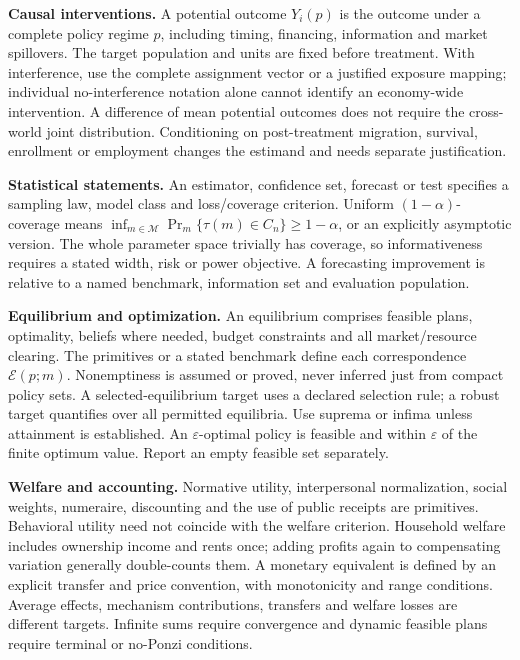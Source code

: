\documentclass[11pt,a4paper]{article}
\begin{document}
\textbf{Causal interventions.} A potential outcome \(Y_i(p)\) is the outcome under a complete policy regime \(p\), including timing, financing, information and market spillovers. The target population and units are fixed before treatment. With interference, use the complete assignment vector or a justified exposure mapping; individual no-interference notation alone cannot identify an economy-wide intervention. A difference of mean potential outcomes does not require the cross-world joint distribution. Conditioning on post-treatment migration, survival, enrollment or employment changes the estimand and needs separate justification.

\textbf{Statistical statements.} An estimator, confidence set, forecast or test specifies a sampling law, model class and loss/coverage criterion. Uniform \((1-\alpha)\)-coverage means \(\inf_{m\in\mathcal M}\Pr_m\{\tau(m)\in C_n\}\geq1-\alpha\), or an explicitly asymptotic version. The whole parameter space trivially has coverage, so informativeness requires a stated width, risk or power objective. A forecasting improvement is relative to a named benchmark, information set and evaluation population.

\textbf{Equilibrium and optimization.} An equilibrium comprises feasible plans, optimality, beliefs where needed, budget constraints and all market/resource clearing. The primitives or a stated benchmark define each correspondence \(\mathcal E(p;m)\). Nonemptiness is assumed or proved, never inferred just from compact policy sets. A selected-equilibrium target uses a declared selection rule; a robust target quantifies over all permitted equilibria. Use suprema or infima unless attainment is established. An \(\varepsilon\)-optimal policy is feasible and within \(\varepsilon\) of the finite optimum value. Report an empty feasible set separately.

\textbf{Welfare and accounting.} Normative utility, interpersonal normalization, social weights, numeraire, discounting and the use of public receipts are primitives. Behavioral utility need not coincide with the welfare criterion. Household welfare includes ownership income and rents once; adding profits again to compensating variation generally double-counts them. A monetary equivalent is defined by an explicit transfer and price convention, with monotonicity and range conditions. Average effects, mechanism contributions, transfers and welfare losses are different targets. Infinite sums require convergence and dynamic feasible plans require terminal or no-Ponzi conditions.
\end{document}
